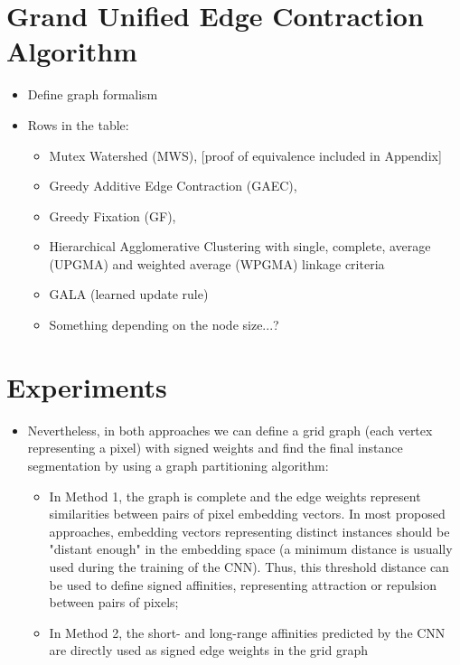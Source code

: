 \documentclass[10pt,twocolumn,letterpaper]{article}
\begin{document}
\section{Grand Unified Edge Contraction Algorithm}
\begin{itemize}
\item Define graph formalism
\item Rows in the table:
\begin{itemize}
\item Mutex Watershed (MWS), [proof of equivalence included in Appendix]
\item Greedy Additive Edge Contraction (GAEC), 
\item Greedy Fixation (GF), 
\item Hierarchical Agglomerative Clustering with single, complete, average (UPGMA) and weighted average (WPGMA) linkage criteria
\item GALA (learned update rule)
\item Something depending on the node size...?
\end{itemize}
\end{itemize}


\section{Experiments}
\begin{itemize}
\item Nevertheless, in both approaches we can define a grid graph (each vertex representing a pixel) with signed weights and find the final instance segmentation by using a graph partitioning algorithm:
\begin{itemize}
\item In Method 1, the graph is complete and the edge weights represent similarities between pairs of pixel embedding vectors. In most proposed approaches, embedding vectors representing distinct instances should be "distant enough" in the embedding space (a minimum distance is usually used during the training of the CNN). Thus, this threshold distance can be used to define signed affinities, representing attraction or repulsion between pairs of pixels;
\item  In Method 2, the short- and long-range affinities predicted by the CNN are directly used as signed edge weights in the grid graph
\end{itemize}
\end{itemize}
\end{document}
